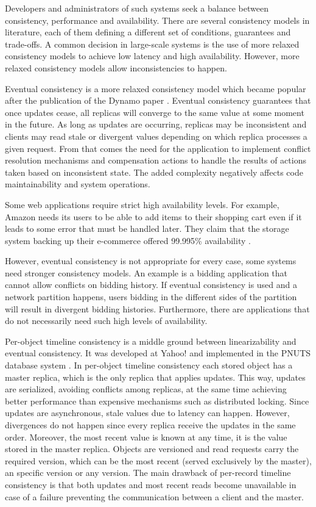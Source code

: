 \documentclass[doublespacing]{bmcart}
\begin{document}
Developers and administrators of such systems seek a balance between
consistency, performance and availability. There are several consistency models
in literature, each of them defining a different set of conditions, guarantees
and trade-offs. A common decision in large-scale systems is the use of more
relaxed consistency models to achieve low latency and high availability.
However, more relaxed consistency models allow inconsistencies to
happen.

Eventual consistency is a more relaxed consistency model which became popular
after the publication of the Dynamo paper \cite{DeCandia2007}. Eventual
consistency guarantees that once updates cease, all replicas will converge to the same value at
some moment in the future. As long as updates are occurring, replicas may be
inconsistent and clients may read stale or divergent values depending on which
replica processes a given request. From that comes the need for the application to implement conflict resolution
mechanisms and compensation actions to handle the results of actions taken based
on inconsistent state. The added complexity negatively affects code
maintainability and system operations.

Some web applications require strict high availability levels. For example,
Amazon needs its users to be able to add items to their shopping cart even if it
leads to some error that must be handled later. They claim that the storage
system backing up their e-commerce offered 99.995\% availability
\cite{DeCandia2007}.

However, eventual consistency is not appropriate for every case, some
systems need stronger consistency models. An example is a bidding application that cannot allow conflicts on
bidding history. If eventual consistency is used and a network partition happens, users bidding in the different sides of the partition will result in divergent bidding histories. Furthermore, there are
applications that do not necessarily need such high levels of availability.

Per-object timeline consistency is a middle ground between linearizability and eventual consistency. It was developed at Yahoo! and implemented in the PNUTS database system \cite{Cooper2008}. In per-object timeline consistency each stored object has a master replica, which is the only replica that applies updates. This way, updates are serialized, avoiding conflicts among replicas, at the same time achieving better performance than expensive mechanisms such as distributed locking. Since updates are
asynchronous, stale values due to latency can happen. However, divergences do
not happen since every replica receive the updates in the same order. Moreover,
the most recent value is known at any time, it is the value stored in the
master replica. Objects are versioned and read requests carry the required
version, which can be the most recent (served exclusively by the master), an specific version or any version. The main drawback of per-record timeline consistency is that both
updates and most recent reads become unavailable in case of a
failure preventing the communication between a client and the master.
\end{document}
